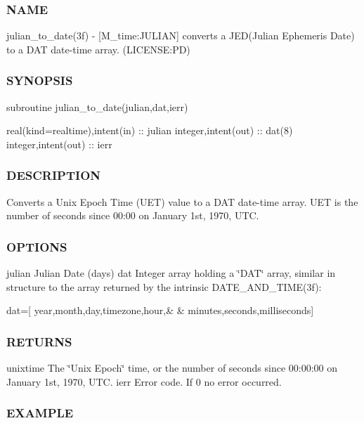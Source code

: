 \subsubsection*{N\+A\+ME}

julian\+\_\+to\+\_\+date(3f) -\/ \mbox{[}M\+\_\+time\+:J\+U\+L\+I\+AN\mbox{]} converts a J\+ED(Julian Ephemeris Date) to a D\+AT date-\/time array. (L\+I\+C\+E\+N\+SE\+:PD) 

\subsubsection*{S\+Y\+N\+O\+P\+S\+IS}

\begin{DoxyVerb}subroutine julian_to_date(julian,dat,ierr)

 real(kind=realtime),intent(in) :: julian
 integer,intent(out)            :: dat(8)
 integer,intent(out)            :: ierr
\end{DoxyVerb}


\subsubsection*{D\+E\+S\+C\+R\+I\+P\+T\+I\+ON}

Converts a Unix Epoch Time (U\+ET) value to a D\+AT date-\/time array. U\+ET is the number of seconds since 00\+:00 on January 1st, 1970, U\+TC.

\subsubsection*{O\+P\+T\+I\+O\+NS}

julian Julian Date (days) dat Integer array holding a \char`\"{}\+D\+A\+T\char`\"{} array, similar in structure to the array returned by the intrinsic D\+A\+T\+E\+\_\+\+A\+N\+D\+\_\+\+T\+I\+M\+E(3f)\+:

dat=\mbox{[} year,month,day,timezone,hour,\& \& minutes,seconds,milliseconds\mbox{]}

\subsubsection*{R\+E\+T\+U\+R\+NS}

unixtime The \char`\"{}\+Unix Epoch\char`\"{} time, or the number of seconds since 00\+:00\+:00 on January 1st, 1970, U\+TC. ierr Error code. If 0 no error occurred.

\subsubsection*{E\+X\+A\+M\+P\+LE}

